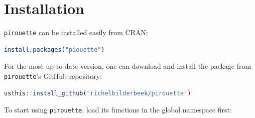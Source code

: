 \documentclass{article}
\begin{document}






\section{Installation}

\verb;pirouette; can be installed easily from CRAN:

\begin{lstlisting}[language=R, floatplacement=H]
install.packages("piouette")
\end{lstlisting}

For the most up-to-date version, 
one can download and install the package from \verb;pirouette;'s GitHub repository:

\begin{lstlisting}[language=R, floatplacement=H]
usthis::install_github("richelbilderbeek/pirouette")
\end{lstlisting}
To start using \verb;pirouette;, load its functions in the global namespace first:
\end{document}
